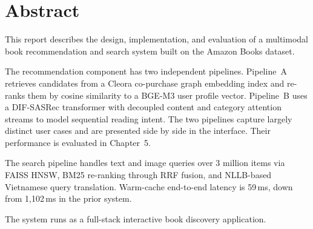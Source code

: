 \chapter*{Abstract}

This report describes the design, implementation, and evaluation of a multimodal book recommendation and search system built on the Amazon Books dataset.

The recommendation component has two independent pipelines. Pipeline~A retrieves candidates from a Cleora co-purchase graph embedding index and re-ranks them by cosine similarity to a BGE-M3 user profile vector. Pipeline~B uses a DIF-SASRec transformer with decoupled content and category attention streams to model sequential reading intent. The two pipelines capture largely distinct user cases and are presented side by side in the interface. Their performance is evaluated in Chapter~5.

The search pipeline handles text and image queries over 3 million items via FAISS HNSW, BM25 re-ranking through RRF fusion, and NLLB-based Vietnamese query translation. Warm-cache end-to-end latency is 59\,ms, down from 1{,}102\,ms in the prior system.

The system runs as a full-stack interactive book discovery application.


